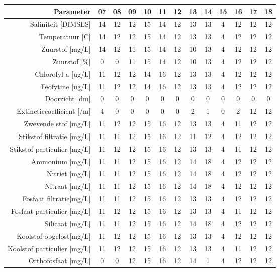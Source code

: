 \begin{tabular}{ r |c | c | c | c | c |c | c | c | c | c | c | c } 
\rowcolor[HTML]{EFEFEF}  
 Parameter & 07 & 08 & 09 & 10 & 11 & 12 & 13 & 14 & 15 & 16 & 17 & 18 \\    \hline     
Saliniteit [DIMSLS] &14 & 12 & 12 & 15 & 14 & 12 & 13 & 13 & 4 & 12 & 12 & 12 \\
Temperatuur [C] &14 & 12 & 12 & 15 & 14 & 12 & 13 & 13 & 4 & 12 & 12 & 12 \\
Zuurstof [mg/L] &14 & 12 & 11 & 15 & 14 & 12 & 10 & 13 & 4 & 12 & 12 & 12 \\
Zuurstof [\%] &0 & 0 & 11 & 15 & 14 & 12 & 10 & 13 & 4 & 12 & 12 & 12 \\
Chlorofyl-a [ug/L] &11 & 12 & 12 & 14 & 16 & 12 & 13 & 13 & 4 & 12 & 12 & 12 \\
Feofytine [ug/L] &11 & 12 & 12 & 14 & 16 & 12 & 13 & 13 & 4 & 12 & 12 & 12 \\
Doorzicht [dm] &0 & 0 & 0 & 0 & 0 & 0 & 0 & 0 & 0 & 0 & 0 & 0 \\
Extinctiecoefficient [/m] &4 & 0 & 0 & 0 & 0 & 0 & 2 & 1 & 0 & 2 & 12 & 12 \\
Zwevende stof [mg/L] &11 & 12 & 12 & 15 & 16 & 12 & 13 & 13 & 4 & 11 & 12 & 12 \\
Stikstof filtratie [mg/L] &11 & 11 & 12 & 15 & 16 & 12 & 11 & 12 & 4 & 12 & 12 & 12 \\
Stikstof particulier [mg/L] &11 & 12 & 12 & 15 & 16 & 12 & 13 & 13 & 4 & 11 & 12 & 12 \\
Ammonium [mg/L] &11 & 11 & 12 & 15 & 16 & 12 & 14 & 18 & 4 & 12 & 12 & 12 \\
Nitriet [mg/L] &11 & 11 & 12 & 15 & 16 & 12 & 14 & 18 & 4 & 12 & 12 & 12 \\
Nitraat [mg/L] &11 & 11 & 12 & 15 & 16 & 12 & 14 & 18 & 4 & 12 & 12 & 12 \\
Fosfaat filtratie[mg/L] &11 & 11 & 12 & 15 & 16 & 12 & 13 & 13 & 4 & 12 & 12 & 12 \\
Fosfaat particulier [mg/L] &11 & 12 & 12 & 15 & 16 & 12 & 13 & 13 & 4 & 11 & 12 & 12 \\
Silicaat [mg/L] &11 & 11 & 12 & 15 & 16 & 12 & 14 & 18 & 4 & 12 & 12 & 12 \\
Koolstof opgelost[mg/L] &11 & 12 & 12 & 15 & 16 & 12 & 13 & 13 & 4 & 12 & 12 & 12 \\
Koolstof particulier [mg/L] &11 & 12 & 12 & 15 & 16 & 12 & 13 & 13 & 4 & 11 & 12 & 12 \\
Orthofosfaat [mg/L] &0 & 0 & 12 & 15 & 16 & 12 & 14 & 1 & 4 & 12 & 12 & 12 \\

\end{tabular}
